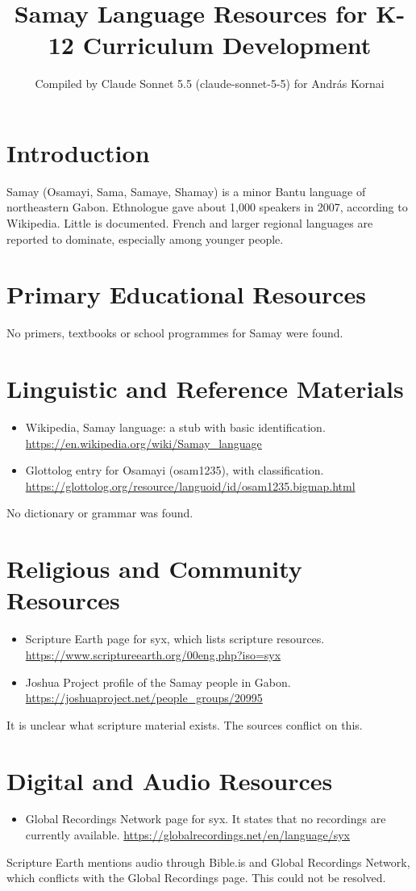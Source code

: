 \documentclass[12pt]{article}
\title{Samay Language Resources for K-12 Curriculum Development}
\author{Compiled by Claude Sonnet 5.5 (claude-sonnet-5-5) for Andr\'as Kornai}
\date{}
\begin{document}
\maketitle

\section{Introduction}
Samay (Osamayi, Sama, Samaye, Shamay) is a minor Bantu language of northeastern Gabon. Ethnologue gave about 1,000 speakers in 2007, according to Wikipedia. Little is documented. French and larger regional languages are reported to dominate, especially among younger people.

\section{Primary Educational Resources}
No primers, textbooks or school programmes for Samay were found.

\section{Linguistic and Reference Materials}
\begin{itemize}
\item Wikipedia, Samay language: a stub with basic identification. \url{https://en.wikipedia.org/wiki/Samay_language}
\item Glottolog entry for Osamayi (osam1235), with classification. \url{https://glottolog.org/resource/languoid/id/osam1235.bigmap.html}
\end{itemize}
No dictionary or grammar was found.

\section{Religious and Community Resources}
\begin{itemize}
\item Scripture Earth page for syx, which lists scripture resources. \url{https://www.scriptureearth.org/00eng.php?iso=syx}
\item Joshua Project profile of the Samay people in Gabon. \url{https://joshuaproject.net/people_groups/20995}
\end{itemize}
It is unclear what scripture material exists. The sources conflict on this.

\section{Digital and Audio Resources}
\begin{itemize}
\item Global Recordings Network page for syx. It states that no recordings are currently available. \url{https://globalrecordings.net/en/language/syx}
\end{itemize}
Scripture Earth mentions audio through Bible.is and Global Recordings Network, which conflicts with the Global Recordings page. This could not be resolved.
\end{document}
